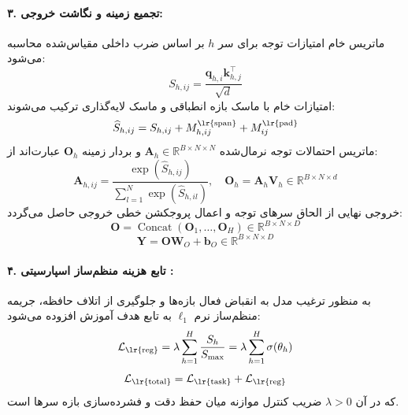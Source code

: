 \paragraph{۳. تجمیع زمینه و نگاشت خروجی:}
ماتریس خام امتیازات توجه برای سر $h$ بر اساس ضرب داخلی مقیاس‌شده محاسبه می‌شود:
\begin{equation}
S_{h, ij} = \frac{\mathbf{q}_{h, i} \mathbf{k}_{h, j}^\top}{\sqrt{d}}
\end{equation}
امتیازات خام با ماسک بازه انطباقی و ماسک لایه‌گذاری  ترکیب می‌شوند:
\begin{equation}
\widehat{S}_{h, ij} = S_{h, ij} + M^{\text{\lr{span}}}_{h, ij} + M^{\text{\lr{pad}}}_{ij}
\end{equation}
ماتریس احتمالات توجه نرمال‌شده $\mathbf{A}_h \in \mathbb{R}^{B \times N \times N}$ و بردار زمینه $\mathbf{O}_h$ عبارت‌اند از:
\begin{equation}
\mathbf{A}_{h, ij} = \frac{\exp(\widehat{S}_{h, ij})}{\sum_{l=1}^N \exp(\widehat{S}_{h, il})}, \quad \mathbf{O}_h = \mathbf{A}_h \mathbf{V}_h \in \mathbb{R}^{B \times N \times d}
\end{equation}
خروجی نهایی از الحاق سرهای توجه و اعمال پروجکشن خطی خروجی حاصل می‌گردد:
\begin{equation}
\mathbf{O} = \operatorname{Concat}(\mathbf{O}_1, \dots, \mathbf{O}_H) \in \mathbb{R}^{B \times N \times D}
\end{equation}
\begin{equation}
\mathbf{Y} = \mathbf{O}\mathbf{W}_O + \mathbf{b}_O \in \mathbb{R}^{B \times N \times D}
\end{equation}

\paragraph{۴. تابع هزینه منظم‌ساز اسپارسیتی :}
به منظور ترغیب مدل به انقباض فعال بازه‌ها و جلوگیری از اتلاف حافظه، جریمه منظم‌ساز نرم $\ell_1$ به تابع هدف آموزش افزوده می‌شود:
\begin{equation}
\mathcal{L}_{\text{\lr{reg}}} = \lambda \sum_{h=1}^H \frac{S_h}{S_{\max}} = \lambda \sum_{h=1}^H \sigma(\theta_h)
\end{equation}
\begin{equation}
\mathcal{L}_{\text{\lr{total}}} = \mathcal{L}_{\text{\lr{task}}} + \mathcal{L}_{\text{\lr{reg}}}
\end{equation}
که در آن $\lambda > 0$ ضریب کنترل موازنه میان حفظ دقت و فشرده‌سازی بازه سرها است.

